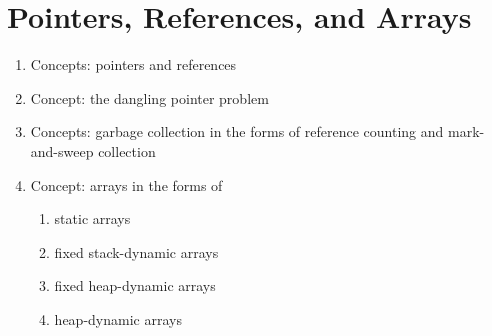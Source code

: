 \section{Pointers, References, and Arrays}\label{sec:Pointers}

\begin{enumerate}[noitemsep]
\item Concepts: pointers and references
\item Concept: the dangling pointer problem
\item Concepts: garbage collection in the forms of reference counting and mark-and-sweep collection
\item Concept: arrays in the forms of
  \begin{enumerate}
  \item static arrays
  \item fixed stack-dynamic arrays
  \item fixed heap-dynamic arrays
  \item heap-dynamic arrays
  \end{enumerate}
\end{enumerate}

